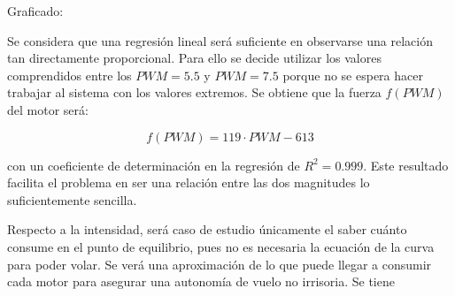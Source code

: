 \documentclass[twoside,11pt]{book}
\begin{document}
Graficado: 

\begin{figure}[ht]
\begin{center}
\end{center}
\end{figure}

Se considera que una regresión lineal será suficiente en observarse una relación tan directamente proporcional. Para ello se decide utilizar los valores comprendidos entre los $PWM=5.5$ y $PWM=7.5$ porque no se espera hacer trabajar al sistema con los valores extremos.  Se obtiene que la fuerza $f(PWM)$ del motor será:

\begin{equation}
f(PWM)=119 \cdot PWM - 613
\end{equation}

con un coeficiente de determinación en la regresión de  $R^2=0.999$. Este resultado facilita el problema en ser una relación entre las dos magnitudes lo suficientemente sencilla.

Respecto a la intensidad, será caso de estudio únicamente el saber cuánto consume en el punto de equilibrio, pues no es necesaria la ecuación de la curva para poder volar. Se verá una aproximación de lo que puede llegar a consumir cada motor para asegurar una autonomía de vuelo no irrisoria. Se tiene 

\end{document}
